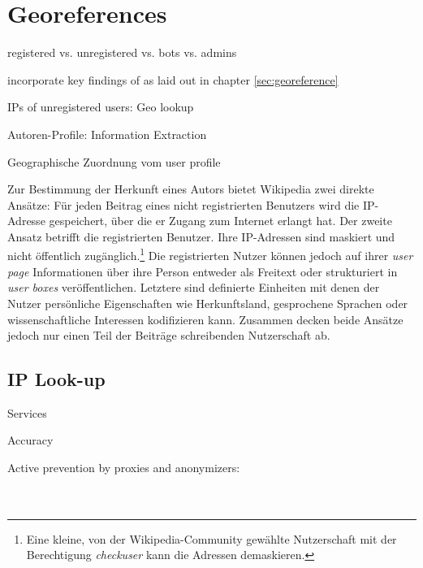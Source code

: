 \section{Georeferences}

\begin{todos}
    \item registered vs. unregistered vs. bots vs. admins
    \item incorporate key findings of \cite{hardy2011volunteered} as laid out in chapter \ref{sec:georeference}
    \item IPs of unregistered users: Geo lookup
    \item Autoren-Profile: Information Extraction
    \item Geographische Zuordnung vom user profile
\end{todos}

Zur Bestimmung der Herkunft eines Autors bietet Wikipedia zwei direkte Ansätze: 
Für jeden Beitrag eines nicht registrierten Benutzers wird die IP-Adresse gespeichert, über die er Zugang zum Internet erlangt hat. 
Der zweite Ansatz betrifft die registrierten Benutzer.
Ihre IP-Adressen sind maskiert und nicht öffentlich zugänglich.\footnote{Eine kleine, von der Wikipedia-Community gewählte Nutzerschaft mit der Berechtigung \emph{checkuser} kann die Adressen demaskieren.}
Die registrierten Nutzer können jedoch auf ihrer \emph{user page} Informationen über ihre Person entweder als Freitext oder strukturiert in \emph{user boxes} veröffentlichen.
Letztere sind definierte Einheiten mit denen der Nutzer persönliche Eigenschaften wie Herkunftsland, gesprochene Sprachen oder wissenschaftliche Interessen kodifizieren kann.
Zusammen decken beide Ansätze jedoch nur einen Teil der Beiträge schreibenden Nutzerschaft ab.


\subsection{IP Look-up}

\begin{todos}
    \item Services
    \item Accuracy
    \item Active prevention by proxies and anonymizers: 
    \\  
    \\ 
    \\ 
\end{todos}

